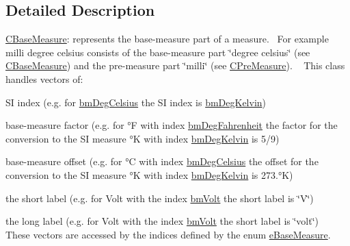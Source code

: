 \subsection{Detailed Description}
\hyperlink{classCBaseMeasure}{C\+Base\+Measure}\+: represents the base-\/measure part of a measure.~\newline
 For example milli degree celsius consists of the base-\/measure part \char`\"{}degree celsius\char`\"{} (see \hyperlink{classCBaseMeasure}{C\+Base\+Measure}) and the pre-\/measure part \char`\"{}milli\char`\"{} (see \hyperlink{classCPreMeasure}{C\+Pre\+Measure}). ~\newline
 This class handles vectors of\+: 


\begin{DoxyItemize}
\item SI index (e.\+g. for \hyperlink{BaseMeasure_8h_ac90e5164ccf1f0d648fba7e94b229a11a42cee40c384c9bbda9aa488151b590b4}{bm\+Deg\+Celsius} the SI index is \hyperlink{BaseMeasure_8h_ac90e5164ccf1f0d648fba7e94b229a11a7d519faa41d1d34d9c378cfc61254074}{bm\+Deg\+Kelvin})
\item base-\/measure factor (e.\+g. for °F with index \hyperlink{BaseMeasure_8h_ac90e5164ccf1f0d648fba7e94b229a11add58e3d33a5d9459dbe3bf9d3f90777c}{bm\+Deg\+Fahrenheit} the factor for the conversion to the SI measure °K with index \hyperlink{BaseMeasure_8h_ac90e5164ccf1f0d648fba7e94b229a11a7d519faa41d1d34d9c378cfc61254074}{bm\+Deg\+Kelvin} is 5/9)
\item base-\/measure offset (e.\+g. for °C with index \hyperlink{BaseMeasure_8h_ac90e5164ccf1f0d648fba7e94b229a11a42cee40c384c9bbda9aa488151b590b4}{bm\+Deg\+Celsius} the offset for the conversion to the SI measure °K with index \hyperlink{BaseMeasure_8h_ac90e5164ccf1f0d648fba7e94b229a11a7d519faa41d1d34d9c378cfc61254074}{bm\+Deg\+Kelvin} is 273.°K)
\item the short label (e.\+g. for Volt with the index \hyperlink{BaseMeasure_8h_ac90e5164ccf1f0d648fba7e94b229a11a662f2aa09627247b53e6f3c5cd10815e}{bm\+Volt} the short label is \char`\"{}\+V\char`\"{})
\item the long label (e.\+g. for Volt with the index \hyperlink{BaseMeasure_8h_ac90e5164ccf1f0d648fba7e94b229a11a662f2aa09627247b53e6f3c5cd10815e}{bm\+Volt} the short label is \char`\"{}volt\char`\"{})~\newline
 These vectors are accessed by the indices defined by the enum \hyperlink{BaseMeasure_8h_ac90e5164ccf1f0d648fba7e94b229a11}{e\+Base\+Measure}.~\newline
 
\end{DoxyItemize}

